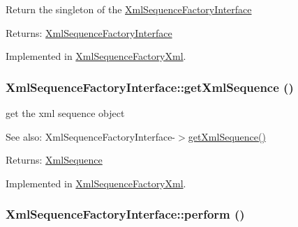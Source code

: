 Return the singleton of the \hyperlink{interface_xml_sequence_factory_interface}{XmlSequenceFactoryInterface}

\begin{Desc}
\item[Returns:]\hyperlink{interface_xml_sequence_factory_interface}{XmlSequenceFactoryInterface} \end{Desc}


Implemented in \hyperlink{class_xml_sequence_factory_xml_04cfad5bd111c3dd8f264e783ed91328}{XmlSequenceFactoryXml}.\hypertarget{interface_xml_sequence_factory_interface_a6f31a5f6a768055644ddb62d101cbb6}{
\subsubsection[{getXmlSequence}]{\setlength{\rightskip}{0pt plus 5cm}XmlSequenceFactoryInterface::getXmlSequence ()}}
\label{interface_xml_sequence_factory_interface_a6f31a5f6a768055644ddb62d101cbb6}


get the xml sequence object

\begin{Desc}
\item[See also:]XmlSequenceFactoryInterface-$>$\hyperlink{interface_xml_sequence_factory_interface_a6f31a5f6a768055644ddb62d101cbb6}{getXmlSequence()} \end{Desc}
\begin{Desc}
\item[Returns:]\hyperlink{class_xml_sequence}{XmlSequence} \end{Desc}


Implemented in \hyperlink{class_xml_sequence_factory_xml_fba8de983895bb05857d75f9b26dd71a}{XmlSequenceFactoryXml}.\hypertarget{interface_xml_sequence_factory_interface_c06f18d6c688317b41477c315f7008f7}{
\subsubsection[{perform}]{\setlength{\rightskip}{0pt plus 5cm}XmlSequenceFactoryInterface::perform ()}}
\label{interface_xml_sequence_factory_interface_c06f18d6c688317b41477c315f7008f7}


